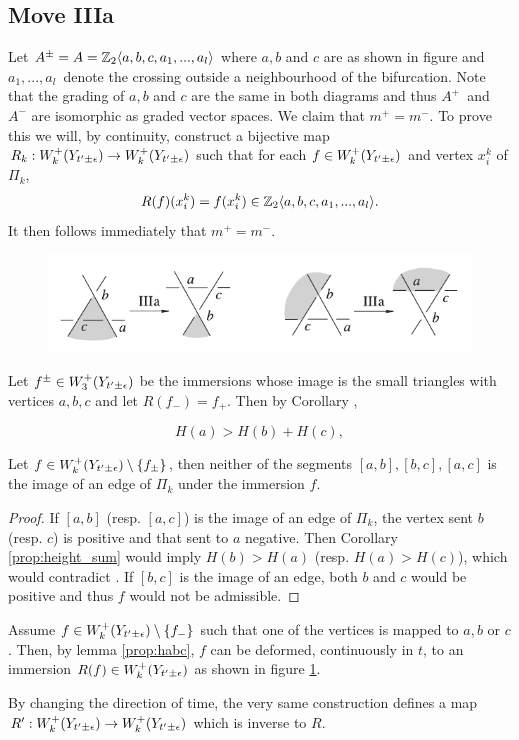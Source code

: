 
\subsection{Move IIIa}
Let $A^\pm = A = \mathbb{Z}_2\langle a,b,c, a_1, ..., a_l \rangle$ where $a,b$ and $c$ are as shown in
figure  and $a_1,...,a_l$ denote the crossing outside a
neighbourhood of the bifurcation. Note that the grading of $a,b$ and $c$
are the same in both diagrams and thus $A^+$ and $A^-$ are isomorphic as graded
vector spaces. We claim that $m^+ = m^-$. 
To prove this we will, by continuity, construct a bijective map
$R_k: W^+_k(Y_{t'\pm\epsilon}) \to W^+_k(Y_{t'\pm\epsilon})$
such that for each $f \in W^+_k(Y_{t'\pm\epsilon})$ and vertex $x_i^k$ of $\Pi_k$, 
\[ R(f)(x_i^k) = f(x_i^k) \in \mathbb{Z}_2\langle a,b,c, a_1, ..., a_l \rangle. \]
It then follows immediately that $m^+ = m^-$.

\begin{figure}
\centering
\includegraphics[width=.6\textwidth]{figs/move_iiia.pdf}
\caption{}
\label{fig:move_iiia}
\end{figure}

Let $f^\pm \in W^+_3(Y_{t'\pm\epsilon})$ be the immersions whose image is
the small triangles with vertices $a,b,c$ and let $R(f_-)=f_+$. Then by Corollary
, 

\begin{equation}
\label{eq:habc}
H(a) > H(b) + H(c), 
\end{equation}

\begin{lemma}
\label{prop:habc}
Let $f\in W_k^+(Y_{t'\pm\epsilon})\setminus\{f_\pm\}$, then neither of the
segments $[a,b], [b,c], [a,c]$ is the image of an edge of $\Pi_k$ under the
immersion $f$.
\end{lemma}

\begin{proof}
If $[a,b]$ (resp. $[a,c]$) is the image of an edge of $\Pi_k$, the vertex sent
$b$ (resp.  $c$) is positive and that sent to $a$ negative. Then
Corollary \ref{prop:height_sum} would imply $H(b) > H(a)$ (resp. $H(a) > H(c)$),
which would contradict . If $[b,c]$ is the image of an edge, both
$b$ and $c$ would be positive and thus $f$ would not be admissible.
\end{proof}

Assume $f \in W_k^+(Y_{t'\pm\epsilon})\setminus\{f_-\}$ such that one of the
vertices is mapped to $a,b$ or $c$. Then, by lemma \ref{prop:habc}, $f$ can be
deformed, continuously in $t$, to an immersion $R(f) \in W_k^+(Y_{t'\pm\epsilon})$
as shown in figure \ref{fig:move_iiia}. 

By changing the direction of time, the very same construction defines a map 
$R': W_k^+(Y_{t'\pm\epsilon}) \to W_k^+(Y_{t'\pm\epsilon})$ which is inverse to $R$.
